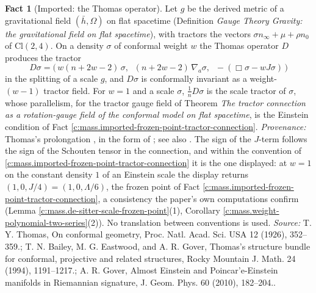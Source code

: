 \documentclass[11pt]{article}
\theoremstyle{definition}
\newtheorem{fact}[theorem]{Fact}
\theoremstyle{plain}
\newcommand{\changedmark}[2]{\marginpar{\raggedright\scriptsize\color{#1}#2}}
\providecommand{\Cl}{}\renewcommand{\Cl}{\mathrm{Cl}}
\providecommand{\hb}{}\renewcommand{\hb}{\bar{h}}
\providecommand{\nInf}{}\renewcommand{\nInf}{n_\infty}
\providecommand{\nO}{}\renewcommand{\nO}{n_0}
\begin{document}
\begin{fact}[Imported: the Thomas operator]\label{c:mass.imported-thomas-operator}
\changedmark{gray}{reworded}
Let $g$ be the derived metric of a gravitational field $(\hb, \Omega)$ on flat spacetime (Definition \emph{Gauge Theory Gravity: the gravitational field on flat spacetime}), with tractors the vectors $\sigma\nInf + \mu + \rho\nO$ of $\Cl(2,4)$. On a density $\sigma$ of conformal weight $w$ the Thomas operator $D$ produces the tractor
\[
D\sigma = \bigl(\, w(n+2w-2)\,\sigma,\;\; (n+2w-2)\,\nabla_{a}\sigma,\;\; -(\Box\sigma - wJ\sigma)\,\bigr)
\]
in the splitting of a scale $g$, and $D\sigma$ is conformally invariant as a weight-$(w-1)$ tractor field. For $w = 1$ and a scale $\sigma$, $\tfrac1n D\sigma$ is the scale tractor of $\sigma$, whose parallelism, for the tractor gauge field of Theorem \emph{The tractor connection as a rotation-gauge field of the conformal model on flat spacetime}, is the Einstein condition of Fact \ref{c:mass.imported-frozen-point-tractor-connection}. \emph{Provenance:} Thomas's prolongation \cite{Thomas1926}, in the form of \cite{BEG1994}; see also \cite{Gover2010}. The sign of the $J$-term follows the sign of the Schouten tensor in the connection, and within the convention of \ref{c:mass.imported-frozen-point-tractor-connection} it is the one displayed: at $w = 1$ on the constant density $1$ of an Einstein scale the display returns $(1, 0, J/4) = (1, 0, \Lambda/6)$, the frozen point of Fact \ref{c:mass.imported-frozen-point-tractor-connection}, a consistency the paper's own computations confirm (Lemma \ref{c:mass.de-sitter-scale-frozen-point}(1), Corollary \ref{c:mass.weight-polynomial-two-series}(2)). No translation between conventions is used.
\emph{Source:} T. Y. Thomas, On conformal geometry, Proc. Natl. Acad. Sci. USA 12 (1926), 352--359.; T. N. Bailey, M. G. Eastwood, and A. R. Gover, Thomas's structure bundle for conformal, projective and related structures, Rocky Mountain J. Math. 24 (1994), 1191--1217.; A. R. Gover, Almost Einstein and Poincar'e-Einstein manifolds in Riemannian signature, J. Geom. Phys. 60 (2010), 182--204..
\end{fact}
\end{document}
